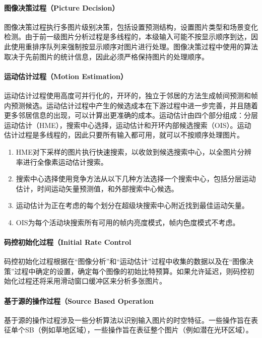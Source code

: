   \paragraph{图像决策过程（Picture Decision）} 图像决策过程执行多图片级别决策，包括设置预测结构，设置图片类型和场景变化检测。由于前一级图片分析过程是多线程的，本级输入可能不按显示顺序到达，因此使用重排序队列来强制按显示顺序对图片进行处理。图像决策过程中使用的算法取决于先前图片的统计信息，因此必须严格保持图片的处理顺序。

  \paragraph{运动估计过程（Motion Estimation）} 运动估计过程使用高度可并行化的，开环的，独立于邻居的方法生成帧间预测和帧内预测候选。运动估计过程中产生的候选成本在下游过程中进一步完善，并且随着更多邻居信息的出现，可以计算出更准确的成本。运动估计由四个部分组成：分层运动估计（HME），搜索中心选择，运动估计和开环内部候选搜索（OIS）。运动估计过程是多线程的，因此只要所有输入都可用，就可以不按顺序处理图片。
  \begin{enumerate} [label=\arabic*)]
    \item HME对下采样的图片执行快速搜索，以收敛到候选搜索中心，以全图片分辨率进行全像素运动估计搜索。
    \item 搜索中心选择使用竞争方法从以下几种方法选择一个搜索中心，包括分层运动估计，时间运动矢量预测值，和外部搜索中心候选。
    \item 运动估计为正在考虑的每个划分在超级块搜索中心附近找到最佳运动矢量。
    \item OIS为每个活动块搜索所有可用的帧内亮度模式，帧内色度模式不考虑。
  \end{enumerate}

  \paragraph{码控初始化过程（Initial Rate Control} 码控初始化过程根据在“图像分析”和“运动估计”过程中收集的数据以及在“图像决策”过程中确定的设置，确定每个图像的初始比特预算。如果允许延迟，则码控初始化过程还将采用滑动窗口缓冲区来分析多张图片。

  \paragraph{基于源的操作过程（Source Based Operation} 基于源的操作过程涉及一些分析算法以识别输入图片的时空特征。一些操作旨在表征单个SB（例如草地区域），一些操作旨在表征整个图片（例如潜在光环区域）。

